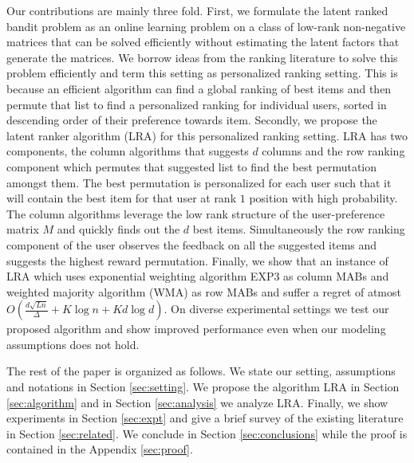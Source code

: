 Our contributions are mainly three fold. First, we formulate the latent ranked bandit problem as an online learning problem on a class of low-rank non-negative matrices that can be solved efficiently without estimating the latent factors that generate the matrices. We borrow ideas from the ranking literature to solve this problem efficiently and term this setting as personalized ranking setting. This is because an efficient algorithm can find a global ranking of best items and then permute that list to find a personalized ranking for individual users, sorted in descending order of their preference towards item. Secondly, we propose the latent ranker algorithm (LRA) for this personalized ranking setting. LRA has two components, the column algorithms that suggests $d$ columns and the row ranking component which permutes that suggested list to find the best permutation amongst them. The best permutation is personalized for each user such that it will contain the best item for that user at rank $1$ position with high probability. The column algorithms leverage the low rank structure of the user-preference matrix $M$ and quickly finds out the $d$ best items. Simultaneously the row ranking component of the user observes the feedback on all the suggested items and suggests the highest reward permutation. Finally, we show that an instance of LRA which uses exponential weighting algorithm EXP3 as column MABs and weighted majority algorithm (WMA) as row MABs and suffer a regret of atmost $O\left(\frac{d \sqrt{L n}}{\Delta} + K \log n + K d \log d\right)$. On diverse experimental settings we test our proposed algorithm and show improved performance even when our modeling assumptions does not hold.

	The rest of the paper is organized as follows. We state our setting, assumptions and notations in Section \ref{sec:setting}. We propose the algorithm LRA in Section \ref{sec:algorithm} and in Section \ref{sec:analysis} we analyze LRA. Finally, we show experiments in Section \ref{sec:expt} and give a brief survey of the existing literature in Section \ref{sec:related}. We conclude in Section \ref{sec:conclusions} while the proof is contained in the Appendix \ref{sec:proof}.